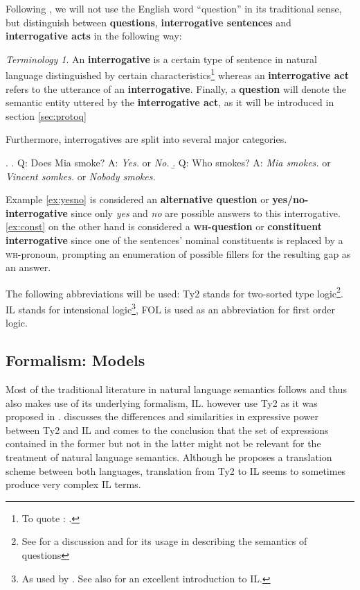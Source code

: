 \documentclass[11pt,a4paper]{article}
\newcommand{\abbr}{\textsf} %
\newcommand{\term}[1]{\textsf{\textbf{#1}}} %
\newcommand{\wh}{\textsc{wh}}
\theoremstyle{remark}
\theoremstyle{remark}
\newtheorem*{termin}{Terminology}
\theoremstyle{definition}
\begin{document}
Following \cite{gs:q}, we will not use the English word
``question'' in its traditional sense, but distinguish between \term{questions},
\term{interrogative sentences} and \term{interrogative acts} in the following
way:

\begin{termin}
  An \term{interrogative} is a certain type of sentence in natural language
  distinguished by certain characteristics\footnote{To quote \cite{gs:q}: .}
  whereas an \term{interrogative act} refers to the utterance of an
  \term{interrogative}. Finally, a
  \term{question} will denote the semantic entity uttered by the
  \term{interrogative act}, as it will be introduced in section
  \ref{sec:protoq}
\end{termin}

Furthermore, interrogatives are split into several major categories.

\ex. \a. \label{ex:yesno} Q: Does Mia smoke? A: \emph{Yes.} or \emph{No.}
\b. \label{ex:const} Q: Who smokes? A: \emph{Mia smokes.} or \emph{Vincent
somkes.} or \emph{Nobody smokes.}

Example \ref{ex:yesno} is considered an \term{alternative question} or
\term{yes/no-interrogative} since only \emph{yes} and \emph{no} are possible
answers to this interrogative. \ref{ex:const} on the other hand is considered a
\term{\wh-question} or \term{constituent interrogative} since one of the
sentences' nominal constituents is replaced by a \wh-pronoun, prompting an
enumeration of possible fillers for the resulting gap as an answer.

The following abbreviations will be used: 
\abbr{Ty2} stands for two-sorted type logic\footnote{See \cite{gallin:ty2} for a
discussion and \cite{gs:sqpa} for its usage in describing the semantics of
questions}. \abbr{IL} stands for intensional logic\footnote{As used by
\cite{ptq}. See also \cite{gamut:2} for an excellent introduction to \abbr{IL}.},
\abbr{FOL}  is used as an abbreviation for first order logic.

\subsection{Formalism: Models}\label{sec:formal}

Most of the traditional literature in natural language semantics follows
\cite{ptq} and thus also makes use of its underlying formalism,
\abbr{IL}. \cite{gs:sqpa} however use \abbr{Ty2} as it was
proposed in \cite{gallin:ty2}. \cite{z:ilty2} discusses the differences and
similarities in expressive power between \abbr{Ty2} and \abbr{IL} and comes to
the conclusion that the set of expressions contained in the former but not in
the latter might not be relevant for the treatment of natural language
semantics. Although he proposes a translation scheme between both languages,
translation from \abbr{Ty2} to \abbr{IL} seems to sometimes produce very complex
\abbr{IL} terms.
\end{document}
